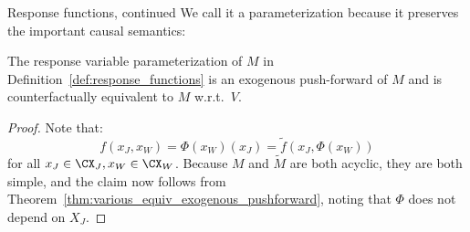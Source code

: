 \begin{frame}{Response functions, continued}
We call it a parameterization because it preserves the important causal semantics:
\begin{Prp}[\ref{prp:counterfactual_equivalence_response_functions}]
  The response variable parameterization of $M$ in Definition~\ref{def:response_functions} is an exogenous push-forward of $M$ and is counterfactually equivalent to $M$ w.r.t.\ $V$.
\end{Prp}
\begin{proof}
  Note that:
    $$f(x_J,x_W) = \Phi(x_W)(x_J) = \tilde{f}(x_J,\Phi(x_W))$$
  for all $x_J \in \CX_J, x_W \in \CX_W$.
  Because $M$ and $\tilde{M}$ are both acyclic, they are both simple, and the claim now follows from Theorem~\ref{thm:various_equiv_exogenous_pushforward}, noting that $\Phi$ does not depend on $X_J$.
\end{proof}
\end{frame}



